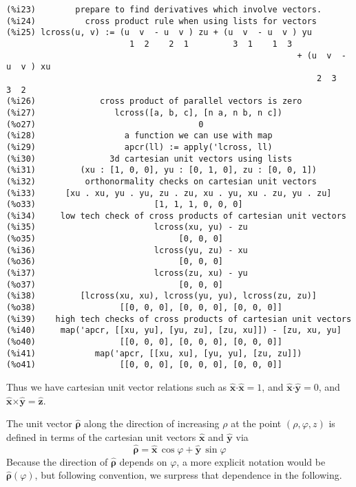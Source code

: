\documentclass[12pt]{article}
\begin{document}
\small
\begin{verbatim}
(%i23)        prepare to find derivatives which involve vectors. 
(%i24)          cross product rule when using lists for vectors 
(%i25) lcross(u, v) := (u  v  - u  v ) zu + (u  v  - u  v ) yu
                         1  2    2  1         3  1    1  3
                                                           + (u  v  - u  v ) xu
                                                               2  3    3  2
(%i26)             cross product of parallel vectors is zero 
(%i27)                lcross([a, b, c], [n a, n b, n c])
(%o27)                                 0
(%i28)                  a function we can use with map 
(%i29)                  apcr(ll) := apply('lcross, ll)
(%i30)               3d cartesian unit vectors using lists 
(%i31)         (xu : [1, 0, 0], yu : [0, 1, 0], zu : [0, 0, 1])
(%i32)          orthonormality checks on cartesian unit vectors 
(%i33)      [xu . xu, yu . yu, zu . zu, xu . yu, xu . zu, yu . zu]
(%o33)                        [1, 1, 1, 0, 0, 0]
(%i34)     low tech check of cross products of cartesian unit vectors
(%i35)                        lcross(xu, yu) - zu
(%o35)                             [0, 0, 0]
(%i36)                        lcross(yu, zu) - xu
(%o36)                             [0, 0, 0]
(%i37)                        lcross(zu, xu) - yu
(%o37)                             [0, 0, 0]
(%i38)         [lcross(xu, xu), lcross(yu, yu), lcross(zu, zu)]
(%o38)                 [[0, 0, 0], [0, 0, 0], [0, 0, 0]]
(%i39)    high tech checks of cross products of cartesian unit vectors
(%i40)     map('apcr, [[xu, yu], [yu, zu], [zu, xu]]) - [zu, xu, yu]
(%o40)                 [[0, 0, 0], [0, 0, 0], [0, 0, 0]]
(%i41)            map('apcr, [[xu, xu], [yu, yu], [zu, zu]])
(%o41)                 [[0, 0, 0], [0, 0, 0], [0, 0, 0]]
\end{verbatim}
\normalsize

Thus we have cartesian unit vector relations such as
  $\mathbf{\hat{x}} \boldsymbol{\cdot} \mathbf{\hat{x}} = 1$, and
  $\mathbf{\hat{x}} \boldsymbol{\cdot} \mathbf{\hat{y}} = 0$, and
  $\mathbf{\hat{x}} \boldsymbol{\times} \mathbf{\hat{y}} = \mathbf{\hat{z}}$.

\smallskip
  
The unit vector $\boldsymbol{\hat{\rho}}$  along the direction  of increasing $\rho$ 
  at the point $(\rho,\varphi,z)$ is defined in terms of the cartesian unit
  vectors $\mathbf{\hat{x}}$ and $\mathbf{\hat{y}}$ via
\begin{equation}  
  \boldsymbol{\hat{\rho}} = \mathbf{\hat{x}}\,\cos \varphi +   \mathbf{\hat{y}} \,\sin \varphi
\end{equation}
Because the direction of $\boldsymbol{\hat{\rho}}$ depends on $\varphi$,
  a more explicit notation would be $\boldsymbol{\hat{\rho}}(\varphi)$, but following 
  convention, we surpress that dependence in the following.
\end{document}
